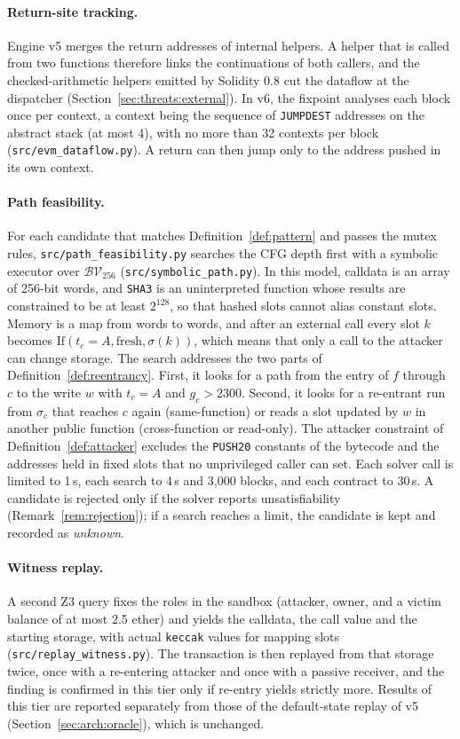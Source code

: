 \documentclass[pdflatex,sn-mathphys]{sn-jnl}
\theoremstyle{thmstyletwo}
\theoremstyle{thmstyletwo}
\begin{document}
\paragraph{Return-site tracking.} Engine v5 merges the return addresses of internal helpers. A helper that is called from two functions therefore links the continuations of both callers, and the checked-arithmetic helpers emitted by Solidity 0.8 cut the dataflow at the dispatcher (Section~\ref{sec:threats:external}). In v6, the fixpoint analyses each block once per context, a context being the sequence of \texttt{JUMPDEST} addresses on the abstract stack (at most 4), with no more than 32 contexts per block (\texttt{src/evm\_dataflow.py}). A return can then jump only to the address pushed in its own context.

\paragraph{Path feasibility.} For each candidate that matches Definition~\ref{def:pattern} and passes the mutex rules, \texttt{src/path\_feasibility.py} searches the CFG depth first with a symbolic executor over $\mathcal{BV}_{256}$ (\texttt{src/symbolic\_path.py}). In this model, calldata is an array of 256-bit words, and \texttt{SHA3} is an uninterpreted function whose results are constrained to be at least $2^{128}$, so that hashed slots cannot alias constant slots. Memory is a map from words to words, and after an external call every slot $k$ becomes $\mathrm{If}(t_c = A, \text{fresh}, \sigma(k))$, which means that only a call to the attacker can change storage. The search addresses the two parts of Definition~\ref{def:reentrancy}. First, it looks for a path from the entry of $f$ through $c$ to the write $w$ with $t_c = A$ and $g_c > 2300$. Second, it looks for a re-entrant run from $\sigma_c$ that reaches $c$ again (same-function) or reads a slot updated by $w$ in another public function (cross-function or read-only). The attacker constraint of Definition~\ref{def:attacker} excludes the \texttt{PUSH20} constants of the bytecode and the addresses held in fixed slots that no unprivileged caller can set. Each solver call is limited to 1\,s, each search to 4\,s and 3,000 blocks, and each contract to 30\,s. A candidate is rejected only if the solver reports unsatisfiability (Remark~\ref{rem:rejection}); if a search reaches a limit, the candidate is kept and recorded as \emph{unknown}.

\paragraph{Witness replay.} A second Z3 query fixes the roles in the sandbox (attacker, owner, and a victim balance of at most 2.5 ether) and yields the calldata, the call value and the starting storage, with actual \texttt{keccak} values for mapping slots (\texttt{src/replay\_witness.py}). The transaction is then replayed from that storage twice, once with a re-entering attacker and once with a passive receiver, and the finding is confirmed in this tier only if re-entry yields strictly more. Results of this tier are reported separately from those of the default-state replay of v5 (Section~\ref{sec:arch:oracle}), which is unchanged.
\end{document}

